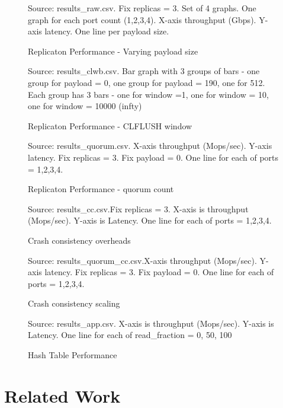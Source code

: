 \documentclass[twocolumn]{article}
\begin{document}
\begin{figure}
  Source: results_raw.csv. Fix replicas = 3. Set of 4 graphs. One graph for each
  port count (1,2,3,4). X-axis throughput (Gbps). Y-axis latency. One line per
  payload size.
  \caption{Replicaton Performance - Varying payload size}
  \label{fig:perf_payload}
\end{figure}

\begin{figure}
  Source: results_clwb.csv. Bar graph with 3 groups of bars - one group for
  payload = 0, one group for payload = 190, one for 512. Each group has 3 bars -
  one for window =1, one for window = 10, one for window = 10000 (infty)
  \caption{Replicaton Performance - CLFLUSH window}
  \label{fig:perf_clflush}
\end{figure}

\begin{figure}
  Source: results_quorum.csv. X-axis throughput (Mops/sec). Y-axis latency. Fix
  replicas = 3. Fix payload = 0. One line for each of ports = 1,2,3,4.
  \caption{Replicaton Performance - quorum count}
  \label{fig:perf_quorums}
\end{figure}

\begin{figure}
  Source: results_cc.csv.Fix replicas = 3. X-axis is throughput
  (Mops/sec). Y-axis is Latency. One line for each of ports = 1,2,3,4.
  \caption{Crash consistency overheads}
  \label{fig:perf_cc}
\end{figure}

\begin{figure}
  Source: results_quorum_cc.csv.X-axis throughput (Mops/sec). Y-axis latency.
  Fix replicas = 3. Fix payload = 0. One line for each of ports = 1,2,3,4.
  \caption{Crash consistency scaling}
  \label{fig:perf_cc}
\end{figure}

\begin{figure}
  Source: results_app.csv. X-axis is throughput
  (Mops/sec). Y-axis is Latency. One line for each of read_fraction = 0, 50, 100
  \caption{Hash Table Performance}
  \label{fig:perf_app}
\end{figure}



\section{Related Work}
\end{document}
